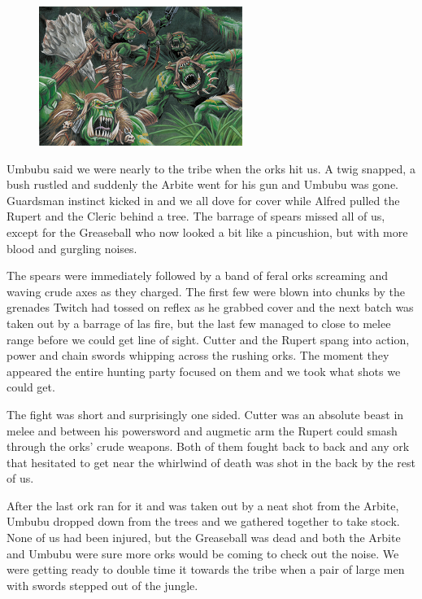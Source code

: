 \begin{figure}
	\begin{center}
		\includegraphics[width=\figwidth]{pics/6/31.png}
	\end{center}
\end{figure}
Umbubu said we were nearly to the tribe when the orks hit us. 
A twig snapped, a bush rustled and suddenly the Arbite went for his gun and Umbubu was gone. 
Guardsman instinct kicked in and we all dove for cover while Alfred pulled the Rupert and the Cleric behind a tree. 
The barrage of spears missed all of us, except for the Greaseball who now looked a bit like a pincushion, but with more blood and gurgling noises.

The spears were immediately followed by a band of feral orks screaming and waving crude axes as they charged. 
The first few were blown into chunks by the grenades Twitch had tossed on reflex as he grabbed cover and the next batch was taken out by a barrage of las fire, but the last few managed to close to melee range before we could get line of sight. 
Cutter and the Rupert spang into action, power and chain swords whipping across the rushing orks. 
The moment they appeared the entire hunting party focused on them and we took what shots we could get.

The fight was short and surprisingly one sided. 
Cutter was an absolute beast in melee and between his powersword and augmetic arm the Rupert could smash through the orks' crude weapons. 
Both of them fought back to back and any ork that hesitated to get near the whirlwind of death was shot in the back by the rest of us.

After the last ork ran for it and was taken out by a neat shot from the Arbite, Umbubu dropped down from the trees and we gathered together to take stock. 
None of us had been injured, but the Greaseball was dead and both the Arbite and Umbubu were sure more orks would be coming to check out the noise. 
We were getting ready to double time it towards the tribe when a pair of large men with swords stepped out of the jungle.

